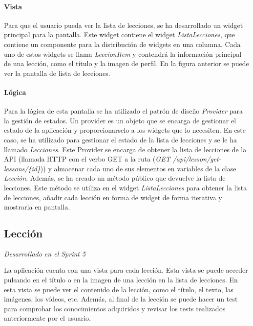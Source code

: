 \paragraph*{Vista}
Para que el usuario pueda ver la lista de lecciones, se ha desarrollado un widget principal para la pantalla. Este widget contiene el widget \textit{ListaLecciones}, que contiene un componente para la distribución de widgets en una columna. Cada uno de estos widgets se llama \textit{LeccionItem} y contendrá la información principal de una lección, como el título y la imagen de perfil. En la figura anterior se puede ver la pantalla de lista de lecciones.

\paragraph*{Lógica}
Para la lógica de esta pantalla se ha utilizado el patrón de diseño \textit{Provider} para la gestión de estados. Un provider es un objeto que se encarga de gestionar el estado de la aplicación y proporcionarselo a los widgets que lo necesiten.
En este caso, se ha utilizado para gestionar el estado de la lista de lecciones y se le ha llamado \textit{Lecciones}.
Este Provider se encarga de obtener la lista de lecciones de la API (llamada HTTP con el verbo GET a la ruta (\textit{GET /api/lesson/get-lessons/\{id\}})) y almacenar cada uno de sus elementos en variables de la clase \textit{Lección}. Además, se ha creado un método público que devuelve la lista de lecciones. Este método se utiliza en el widget \textit{ListaLecciones} para obtener la lista de lecciones, añadir cada lección en forma de widget de forma iterativa
 y mostrarla en pantalla. 

\subsection{Lección} 
\textit{Desarrollado en el Sprint 5}
\label{sec:leccion}

La aplicación cuenta con una vista para cada lección. Esta vista se puede acceder pulsando en el título o en la imagen de una lección en la lista de lecciones. En esta vista se puede ver el contenido de la lección, como el título, el texto, las imágenes, los vídeos, etc.
Además, al final de la lección se puede hacer un test para comprobar los conocimientos adquiridos y revisar los tests realizados anteriormente por el usuario.

